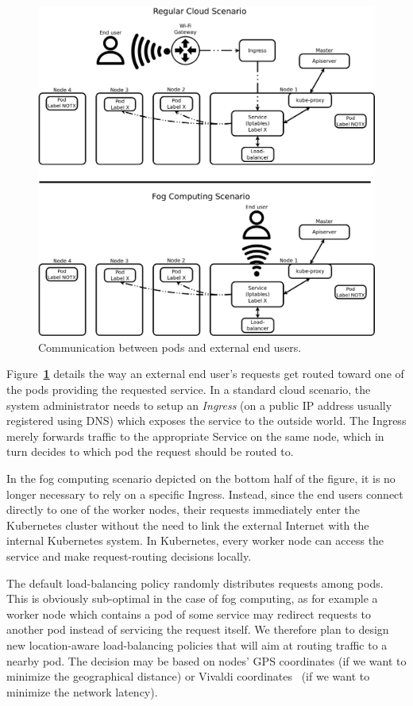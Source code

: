 \documentclass[letterpaper,twocolumn,10pt]{article}
\let\origref\ref
\def\ref#1{\textbf{\origref{#1}}}
\begin{document}
\begin{figure}[tbp]
  \centering
  \includegraphics[width=\linewidth]{images/ing.png}
  \caption{Communication between pods and external end users.}
  \label{fig:ing}
\end{figure}

Figure~\ref{fig:ing} details the way an external end user's requests
get routed toward one of the pods providing the requested service. In
a standard cloud scenario, the system administrator needs to setup an
\emph{Ingress} (on a public IP address usually registered using DNS)
which exposes the service to the outside world. The Ingress merely
forwards traffic to the appropriate Service on the same node, which in
turn decides to which pod the request should be routed to.

In the fog computing scenario depicted on the bottom half of the
figure, it is no longer necessary to rely on a specific
Ingress. Instead, since the end users connect directly to one of the
worker nodes, their requests immediately enter the Kubernetes cluster
without the need to link the external Internet with the internal
Kubernetes system. In Kubernetes, every worker node can access the
service and make request-routing decisions locally.

The default load-balancing policy randomly distributes requests among
pods. This is obviously sub-optimal in the case of fog computing, as
for example a worker node which contains a pod of some service may
redirect requests to another pod instead of servicing the request
itself. We therefore plan to design new location-aware load-balancing
policies that will aim at routing traffic to a nearby pod. The
decision may be based on nodes' GPS coordinates (if we want to
minimize the geographical distance) or Vivaldi
coordinates~\cite{vivaldi} (if we want to minimize the network
latency).
\end{document}
